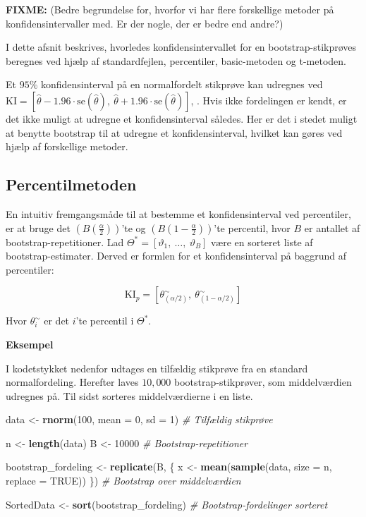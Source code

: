 \documentclass[
]{book}
\newenvironment{Shaded}{\begin{snugshade}}{\end{snugshade}}
\newcommand{\CommentTok}[1]{\textcolor[rgb]{0.56,0.35,0.01}{\textit{#1}}}
\newcommand{\DataTypeTok}[1]{\textcolor[rgb]{0.13,0.29,0.53}{#1}}
\newcommand{\DecValTok}[1]{\textcolor[rgb]{0.00,0.00,0.81}{#1}}
\newcommand{\KeywordTok}[1]{\textcolor[rgb]{0.13,0.29,0.53}{\textbf{#1}}}
\newcommand{\NormalTok}[1]{#1}
\newcommand{\OtherTok}[1]{\textcolor[rgb]{0.56,0.35,0.01}{#1}}
\newcommand{\StringTok}[1]{\textcolor[rgb]{0.31,0.60,0.02}{#1}}
\theoremstyle{definition}
\theoremstyle{definition}
\theoremstyle{definition}
\theoremstyle{remark}
\begin{document}
\textbf{FIXME:} (Bedre begrundelse for, hvorfor vi har flere forskellige metoder på konfidensintervaller med. Er der nogle, der er bedre end andre?)

I dette afsnit beskrives, hvorledes konfidensintervallet for en bootstrap-stikprøves beregnes ved hjælp af standardfejlen, percentiler, basic-metoden og t-metoden.

Et \(95\%\) konfidensinterval på en normalfordelt stikprøve kan udregnes ved \(\text{KI} = [\hat\theta - 1.96\cdot \text{se}(\hat\theta),~\hat\theta + 1.96\cdot \text{se}(\hat\theta)]\), \citep{BootKI}. Hvis ikke fordelingen er kendt, er det ikke muligt at udregne et konfidensinterval således. Her er det i stedet muligt at benytte bootstrap til at udregne et konfidensinterval, hvilket kan gøres ved hjælp af forskellige metoder.

\hypertarget{percentilmetoden}{%
\subsection{Percentilmetoden}\label{percentilmetoden}}

En intuitiv fremgangsmåde til at bestemme et konfidensinterval ved percentiler, er at bruge det \((B(\frac{\alpha}{2}))\)'te og \((B(1-\frac{\alpha}{2}))\)'te percentil, hvor \(B\) er antallet af bootstrap-repetitioner. Lad \(\Theta^* = [\vartheta_1,~ \ldots,~\vartheta_B]\) være en sorteret liste af bootstrap-estimater. Derved er formlen for et konfidensinterval på baggrund af percentiler:

\[\text{KI}_p = \left[\theta^{{\sim}}_{(\alpha/2)},~\theta^{{\sim}}_{(1-\alpha/2)}\right]\]

Hvor \(\theta^{\sim}_i\) er det \(i\)'te percentil i \(\Theta^*\). \citep{TPKI}

\textbf{Eksempel}

I kodetstykket nedenfor udtages en tilfældig stikprøve fra en standard normalfordeling. Herefter laves \(10,000\) bootstrap-stikprøver, som middelværdien udregnes på. Til sidst sorteres middelværdierne i en liste.

\begin{Shaded}
\begin{Highlighting}[]
\NormalTok{data <-}\StringTok{ }\KeywordTok{rnorm}\NormalTok{(}\DecValTok{100}\NormalTok{, }\DataTypeTok{mean =} \DecValTok{0}\NormalTok{, }\DataTypeTok{sd =} \DecValTok{1}\NormalTok{) }\CommentTok{# Tilfældig stikprøve}

\NormalTok{n <-}\StringTok{ }\KeywordTok{length}\NormalTok{(data)}
\NormalTok{B <-}\StringTok{ }\DecValTok{10000} \CommentTok{# Bootstrap-repetitioner}

\NormalTok{bootstrap_fordeling <-}\StringTok{ }\KeywordTok{replicate}\NormalTok{(B, \{}
\NormalTok{  x <-}\StringTok{ }\KeywordTok{mean}\NormalTok{(}\KeywordTok{sample}\NormalTok{(data, }\DataTypeTok{size =}\NormalTok{ n, }\DataTypeTok{replace =} \OtherTok{TRUE}\NormalTok{))}
\NormalTok{\}) }\CommentTok{# Bootstrap over middelværdien}

\NormalTok{SortedData <-}\StringTok{ }\KeywordTok{sort}\NormalTok{(bootstrap_fordeling) }\CommentTok{# Bootstrap-fordelinger sorteret}
\end{Highlighting}
\end{Shaded}
\end{document}

